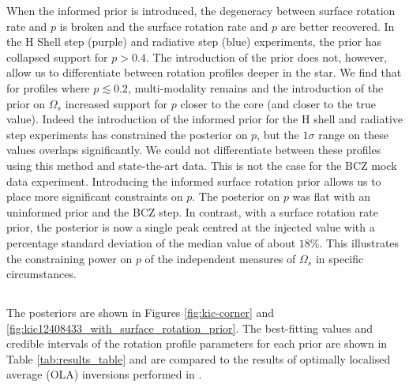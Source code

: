  When the informed prior is introduced, the degeneracy between surface rotation rate and $p$ is broken and the surface rotation rate and $p$ are better recovered. In the H Shell step (purple) and radiative step (blue) experiments, the prior has collapsed support for $p>0.4$. The introduction of the prior does not, however, allow us to differentiate between rotation profiles deeper in the star. We find that for profiles where $p\lesssim0.2$, multi-modality remains and the introduction of the prior on $\Omega_s$ increased support for $p$ closer to the core (and closer to the true value). Indeed the introduction of the informed prior for the H shell and radiative step experiments has constrained the posterior on $p$, but the $1\sigma$ range on these values overlaps significantly. We could not differentiate between these profiles using this method and state-the-art data. This is not the case for the BCZ mock data experiment. Introducing the informed surface rotation prior allows us to place more significant constraints on $p$. The posterior on $p$ was flat with an uninformed prior and the BCZ step. In contrast, with a surface rotation rate prior, the posterior is now a single peak centred at the injected value with a percentage standard deviation of the median value of about $18\%$. This illustrates the constraining power on $p$ of the independent measures of $\Omega_s$ in specific circumstances.

\subsection{\thestar}

 The posteriors are shown in Figures \ref{fig:kic-corner} and \ref{fig:kic12408433_with_surface_rotation_prior}. The best-fitting values and credible intervals of the rotation profile parameters for each prior are shown in Table \ref{tab:results_table} and are compared to the results of optimally localised average (OLA) inversions performed in \citet{deheuvels_seismic_2014}.

